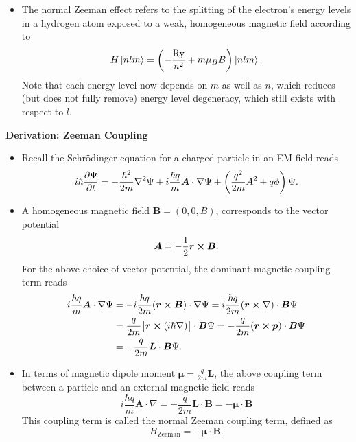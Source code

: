 \documentclass[11pt, a4paper]{article}
\renewcommand{\grad}{\nabla}
\renewcommand{\laplacian}{\nabla^{2}}
\newcommand{\Schro}{Schr\"{o}dinger\xspace}
\renewcommand{\vec}[1]{\bm{#1}}  %
\renewcommand{\r}{\vec{r}}  %
\renewcommand{\L}{\vec{L}}  %
\newcommand{\A}{\vec{A}}  %
\newcommand{\B}{\vec{B}}  %
\newcommand{\m}{\vec{\mu}}  %
\renewcommand{\P}{\Psi}  %
\begin{document}
\begin{itemize}
	\item The normal Zeeman effect refers to the splitting of the electron's energy levels in a hydrogen atom exposed to a weak, homogeneous magnetic field according to
	\begin{equation*}
		H \ket{nlm} = \left(- \frac{\si{Ry}}{n^{2}} + m \mu_{B}B\right)\ket{nlm}.
	\end{equation*}
    Note that each energy level now depends on $ m $ as well as $ n $, which reduces (but does not fully remove) energy level degeneracy, which still exists with respect to $ l $. 

    
\end{itemize}

\textbf{Derivation: Zeeman Coupling}
\begin{itemize}

    \item Recall the \Schro equation for a charged particle in an EM field reads
    \begin{equation*}
        i \hbar \pdv{\Psi}{t} = - \frac{\hbar^{2}}{2m} \laplacian \Psi + i \frac{\hbar q}{m}\A \cdot \grad \P + \left( \frac{q^{2}}{2m}A^{2} + q\phi \right) \Psi.
    \end{equation*}
	
	\item A homogeneous magnetic field $ \vec{B} = (0, 0, B) $, corresponds to the vector potential
	\begin{equation*}
        \A = -\frac{1}{2}\r \cross \vec{B}.
	\end{equation*}
	For the above choice of vector potential, the dominant magnetic coupling term reads
	\begin{align*}
		i \frac{\hbar q}{m}\A \cdot \grad \P &= - i\frac{\hbar q}{2m}(\r \cross \vec{B}) \cdot \grad \P = i\frac{\hbar q}{2m}(\r \cross \nabla) \cdot \vec{B} \P\\
		& = \frac{q}{2m}\big[\r \cross (i\hbar \nabla)\big] \cdot \vec{B} \P = - \frac{q}{2m}(\r \cross \vec{p}) \cdot \vec{B} \P \\
		& = - \frac{q}{2m}\vec{L} \cdot \B \P.
	\end{align*}
	
	
    \item In terms of magnetic dipole moment $ \m = \frac{q}{2m}\L $, the above coupling term between a particle and an external magnetic field reads
	\begin{equation*}
		i \frac{\hbar q}{m}\A \cdot \grad = - \frac{q}{2m}\vec{L} \cdot \B = - \m \cdot \B
	\end{equation*}
	This coupling term is called the normal Zeeman coupling term, defined as
	\begin{equation*}
		H_{\text{Zeeman}} = - \m \cdot \B.
	\end{equation*}

\end{itemize}
\end{document}
